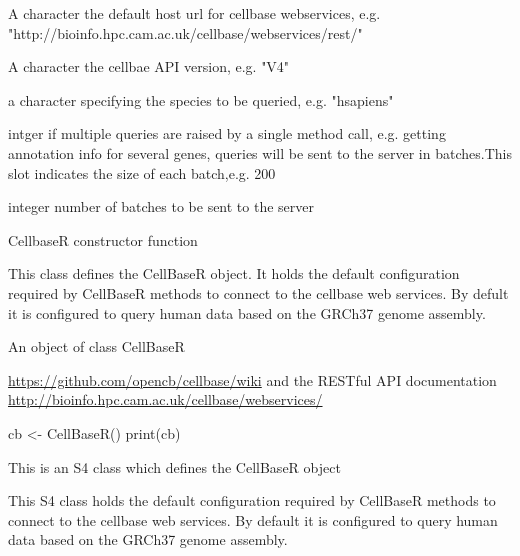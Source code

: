 \documentclass[letterpaper]{book}
\begin{document}
%
\begin{Arguments}
\begin{ldescription}
\item[\code{host}] A character the default host url for cellbase webservices,
e.g. "http://bioinfo.hpc.cam.ac.uk/cellbase/webservices/rest/"

\item[\code{version}] A character the cellbae API version, e.g. "V4"

\item[\code{species}] a character specifying the species to be queried, e.g. 
"hsapiens"

\item[\code{batch\_size}] intger if multiple queries are raised by a single method 
call, e.g. getting annotation info for several genes, queries will be sent 
to the server in batches.This slot indicates the size of each batch,e.g. 200

\item[\code{num\_threads}] integer number of  batches to be sent to the server
\end{ldescription}
\end{Arguments}
%
\begin{Details}\relax
CellbaseR constructor function


This class defines the CellBaseR object. It holds the default
configuration required by CellBaseR methods to connect to the
cellbase web services. By defult it is configured to query human
data based on the GRCh37 genome assembly.
\end{Details}
%
\begin{Value}
An object of class CellBaseR
\end{Value}
%
\begin{SeeAlso}\relax
\url{https://github.com/opencb/cellbase/wiki} 
and the RESTful API documentation 
\url{http://bioinfo.hpc.cam.ac.uk/cellbase/webservices/}
\end{SeeAlso}
%
\begin{Examples}
\begin{ExampleCode}
   cb <- CellBaseR()
   print(cb)
\end{ExampleCode}
\end{Examples}
%
\begin{Description}\relax
This is an S4 class  which defines the CellBaseR object
\end{Description}
%
\begin{Details}\relax
This S4 class holds the default configuration required by CellBaseR 
methods to connect to the cellbase web 
services. By default it is configured to query human data based on the GRCh37
genome assembly.
\end{Details}
\end{document}
